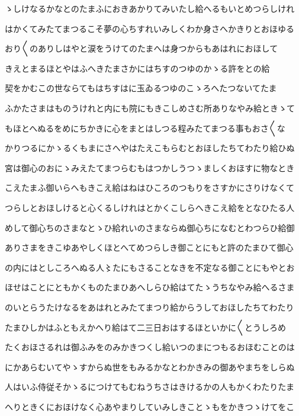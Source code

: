 \documentclass[a4paper,11pt,landscape]{ltjtarticle}
\begin{document}
\par\medskip
ゝしけなるかなとのたまふにおきあかりてみいたし給へるもいとめつらしけれ
\par\medskip
はかくてみたてまつるこそ夢の心ちすれいみしくわか身さへかきりとおほゆる
\par\medskip
おり〱のありしはやと涙をうけてのたまへは身つからもあはれにおほして
\par\medskip
きえとまるほとやはふへきたまさかにはちすのつゆのかゝる許をとの給
\par\medskip
契をかむこの世ならてもはちすはに玉ゐるつゆのこゝろへたつないてたま
\par\medskip
ふかたさまはものうけれと内にも院にもきこしめさむ所ありなやみ給ときゝて
\par\medskip
もほとへぬるをめにちかきに心をまとはしつる程みたてまつる事もおさ〱な
\par\medskip
かりつるにかゝるくもまにさへやはたえこもらむとおほしたちてわたり給ひぬ
\par\medskip
宮は御心のおにゝみえたてまつらむもはつかしうつゝましくおほすに物なとき
\par\medskip
こえたまふ御いらへもきこえ給はねはひころのつもりをさすかにさりけなくて
\par\medskip
つらしとおほしけると心くるしけれはとかくこしらへきこえ給をとなひたる人
\par\medskip
めして御心ちのさまなとゝひ給れいのさまならぬ御心ちになむとわつらひ給御
\par\medskip
ありさまをきこゆあやしくほとへてめつらしき御ことにもと許のたまひて御心
\par\medskip
の内にはとしころへぬる人〻たにもさることなきを不定なる御ことにもやとお
\par\medskip
ほせはことにともかくものたまひあへしらひ給はてたゝうちなやみ給へるさま
\par\medskip
のいとらうたけなるをあはれとみたてまつり給からうしておほしたちてわたり
\par\medskip
たまひしかはふともえかへり給はて二三日おはするほといかに〱とうしろめ
\par\medskip
たくおほさるれは御ふみをのみかきつくし給いつのまにつもるおほむことのは
\par\medskip
にかあらむいてやゝすからぬ世をもみるかなとわかきみの御あやまちをしらぬ
\par\medskip
人はいふ侍従そかゝるにつけてもむねうちさはきけるかの人もかくわたりたま
\par\medskip
へりときくにおほけなく心あやまりしていみしきことゝもをかきつゝけてをこ
\par\medskip
\end{document}
